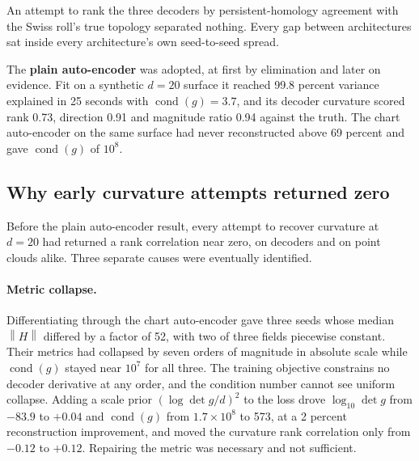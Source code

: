 \documentclass[11pt,a4paper]{article}
\newcommand{\norm}[1]{\left\lVert #1 \right\rVert}
\begin{document}
An attempt to rank the three decoders by persistent-homology agreement with the Swiss roll's true topology separated nothing. Every gap between architectures sat inside every architecture's own seed-to-seed spread.

The \textbf{plain auto-encoder} was adopted, at first by elimination and later on evidence. Fit on a synthetic $d = 20$ surface it reached 99.8 percent variance explained in 25 seconds with $\operatorname{cond}(g) = 3.7$, and its decoder curvature scored rank 0.73, direction 0.91 and magnitude ratio 0.94 against the truth. The chart auto-encoder on the same surface had never reconstructed above 69 percent and gave $\operatorname{cond}(g)$ of $10^8$.

\subsection{Why early curvature attempts returned zero}

Before the plain auto-encoder result, every attempt to recover curvature at $d = 20$ had returned a rank correlation near zero, on decoders and on point clouds alike. Three separate causes were eventually identified.

\paragraph{Metric collapse.} Differentiating through the chart auto-encoder gave three seeds whose median $\norm{H}$ differed by a factor of 52, with two of three fields piecewise constant. Their metrics had collapsed by seven orders of magnitude in absolute scale while $\operatorname{cond}(g)$ stayed near $10^7$ for all three. The training objective constrains no decoder derivative at any order, and the condition number cannot see uniform collapse. Adding a scale prior $(\log\det g / d)^2$ to the loss drove $\log_{10}\det g$ from $-83.9$ to $+0.04$ and $\operatorname{cond}(g)$ from $1.7\times10^8$ to 573, at a 2 percent reconstruction improvement, and moved the curvature rank correlation only from $-0.12$ to $+0.12$. Repairing the metric was necessary and not sufficient.
\end{document}
